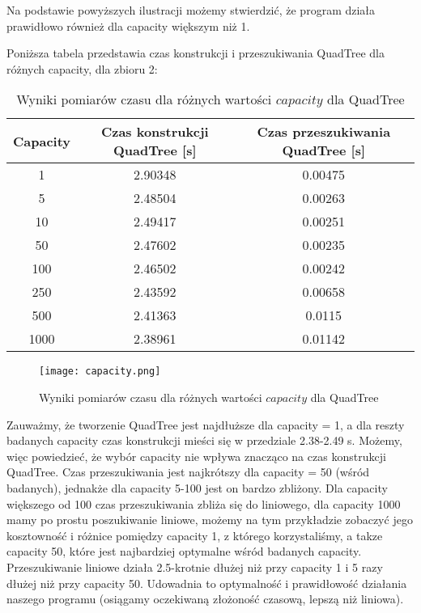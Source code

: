 \documentclass[a4paper, 12pt]{article}
\begin{document}
      \noindent
      \quad Na podstawie powyższych ilustracji możemy stwierdzić, że program działa prawidłowo również dla capacity większym niż 1.

      \noindent
      \quad Poniższa tabela przedstawia czas konstrukcji i przeszukiwania QuadTree dla różnych capacity, dla zbioru 2:

      \begin{table}[h!]
      \centering
      \begin{center}
      \begin{tabular}{|c|c|c|}
          \hline
          Capacity & Czas konstrukcji QuadTree [s] & Czas przeszukiwania QuadTree [s] \\
          \hline
          1 & 2.90348 & 0.00475 \\
          \hline
          5 & 2.48504 & 0.00263 \\
          \hline
          10 & 2.49417 & 0.00251 \\
          \hline
          50 & 2.47602 & 0.00235 \\
          \hline
          100 & 2.46502 & 0.00242 \\
          \hline
          250 & 2.43592 & 0.00658 \\
          \hline
          500 & 2.41363 & 0.0115 \\
          \hline
          1000 & 2.38961 & 0.01142 \\
          \hline
      \end{tabular}
      \end{center}
      \caption{Wyniki pomiarów czasu dla różnych wartości $capacity$ dla QuadTree}
      \end{table}

      \begin{figure}[h!]
      \centering
        \texttt{[image: capacity.png]}
        \caption{Wyniki pomiarów czasu dla różnych wartości $capacity$ dla QuadTree}
      \end{figure}

      \noindent
      \quad Zauważmy, że tworzenie QuadTree jest najdłuższe dla capacity = 1, a dla reszty badanych capacity czas konstrukcji mieści się w przedziale 2.38-2.49 s. Możemy, więc powiedzieć, że wybór capacity nie wpływa znacząco na czas konstrukcji QuadTree. Czas przeszukiwania jest najkrótszy dla capacity = 50 (wśród badanych), jednakże dla capacity 5-100 jest on bardzo zbliżony.  Dla capacity większego od 100 czas przeszukiwania zbliża się do liniowego, dla capacity 1000 mamy po prostu poszukiwanie liniowe, możemy na tym przykładzie zobaczyć jego kosztowność i różnice pomiędzy capacity 1, z którego korzystaliśmy, a takze capacity 50, które jest najbardziej optymalne wśród badanych capacity. Przeszukiwanie liniowe działa 2.5-krotnie dłużej niż przy capacity 1 i 5 razy dłużej niż przy capacity 50. Udowadnia to optymalność i prawidłowość działania naszego programu (osiągamy oczekiwaną złożoność czasową, lepszą niż liniowa).
\end{document}
